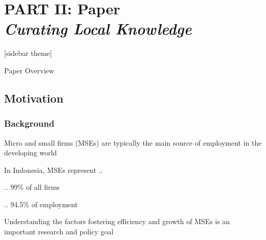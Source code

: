 \documentclass[hideothersubsections, usenames,dvipsnames,11pt]{beamer}
\newenvironment{itemize_2pt}{\itemize\addtolength{\itemsep}{2pt}}{\enditemize}
\begin{document}
\date{March 04, 2021}


\section{\textbf{PART II: Paper} \\ \quad \emph{Curating Local Knowledge}}


\begin{frame}
\titlepage
\end{frame}


[sidebar theme]

\begin{frame}{Paper Overview}
\end{frame}


\subsection{Motivation}

\begin{frame}
\frametitle{Background}
	\begin{itemize_2pt}
	\item Micro and small firms (MSEs) are typically the main \textcolor{bdf}{source of employment} in the developing world
	\item In \textcolor{bdf}{Indonesia}, MSEs represent .. 
	\begin{itemize_2pt}
		\item .. 99\% of all firms
		\item .. 94.5\% of employment
	\end{itemize_2pt} 
	\item Understanding the factors fostering efficiency and growth of MSEs is an important research and policy goal
	\end{itemize_2pt}
\end{frame}
\end{document}
